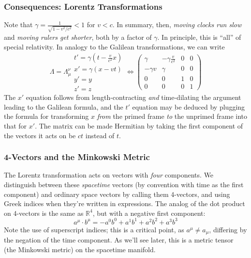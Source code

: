 \documentclass[10pt]{beamer}
\begin{document}
\begin{frame}
  \frametitle{Consequences: Lorentz Transformations}
  Note that $\gamma=\frac{1}{\sqrt{1-v^{2}/c^{2}}}<1$ for $v<c$.
  In summary, then, \textit{moving clocks run slow} and \textit{moving rulers get shorter}, both by a factor of $\gamma$.
  In principle, this is ``all'' of special relativity.
  In analogy to the Galilean transformations, we can write
  \[
    \Lambda = \Lambda_{\mu}^{\nu}
    \begin{array}{l}
      t' = \gamma\left( t-\frac{v}{c^{2}}x \right) \\
      x' = \gamma (x - vt) \\
      y' = y \\
      z' = z
    \end{array}
    \Leftrightarrow
    \begin{pmatrix}
      \gamma & -\gamma \frac{v}{c^{2}} & 0 & 0 \\
      -\gamma v & \gamma & 0 & 0 \\
      0 & 0 & 1 & 0 \\
      0 & 0 & 0 & 1
    \end{pmatrix}
  \]
  The $x'$ equation follows from length-contracting \textit{and} time-dilating the argument leading to the Galilean formula,
  and the $t'$ equation may be deduced by plugging the formula for transforming $x$ \textit{from} the primed frame \textit{to} the unprimed frame into that for $x'$.
  The matrix can be made Hermitian by taking the first component of the vectors it acts on be $ct$ instead of $t$.
\end{frame}

\begin{frame}
  \frametitle{4-Vectors and the Minkowski Metric}
  The Lorentz transformation acts on vectors with \textit{four} components.
  We distinguish between these \textit{spacetime} vectors (by convention with time as the first component) and ordinary space vectors by calling them 4-vectors, and using Greek indices when they're written in expressions.
  The analog of the dot product on 4-vectors is the same as $\mathbb{R}^{4}$, but with a negative first component:
  \[
    {a^{\mu}}\cdot{b^{\mu}}=-a^{0}b^{0}+a^{1}b^{1}+a^{2}b^{2}+a^{3}b^{3}
  \]
  Note the use of superscript indices; this is a critical point, as $a^{\mu}\neq a_{\mu}$, differing by the negation of the time component.
  As we'll see later, this is a metric tensor (the Minkowski metric) on the spacetime manifold.
\end{frame}
\end{document}
